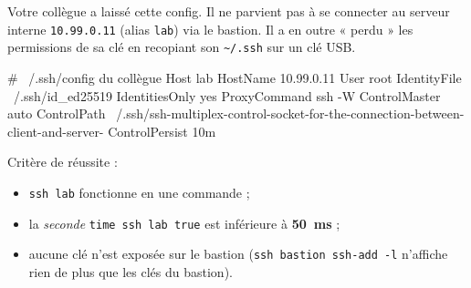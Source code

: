\documentclass[a4paper,10pt]{exam}
\begin{document}
Votre collègue a laissé cette config. Il ne parvient pas à se connecter au serveur
interne \texttt{10.99.0.11} (alias \texttt{lab}) via le bastion. Il a en outre « perdu »
les permissions de sa clé en recopiant son \texttt{\textasciitilde/.ssh} sur un clé USB.

\begin{bashcode}
# ~/.ssh/config du collègue
Host lab
    HostName 10.99.0.11
    User root
    IdentityFile ~/.ssh/id_ed25519
    IdentitiesOnly yes
    ProxyCommand ssh -W %
    ControlMaster auto
    ControlPath ~/.ssh/ssh-multiplex-control-socket-for-the-connection-between-client-and-server-%
    ControlPersist 10m
\end{bashcode}

Critère de réussite :
\begin{itemize}
  \item \texttt{ssh lab} fonctionne en une commande ;
  \item la \emph{seconde} \texttt{time ssh lab true} est inférieure à \textbf{50~ms} ;
  \item aucune clé n'est exposée sur le bastion (\texttt{ssh bastion ssh-add -l} n'affiche
    rien de plus que les clés du bastion).
\end{itemize}
\end{document}
